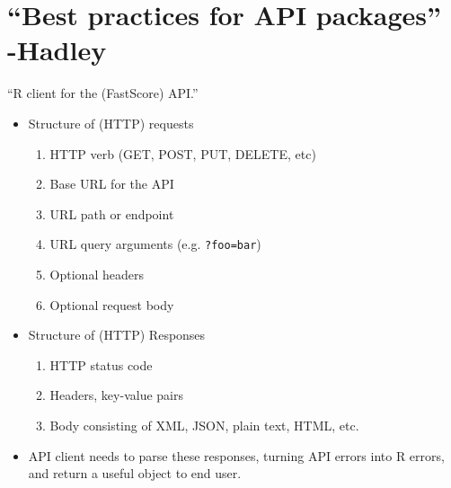\documentclass{article}
\begin{document}
\section{``Best practices for API packages'' -Hadley}
``R client for the (FastScore) API.''
\begin{itemize}
\item Structure of (HTTP) requests
  \begin{enumerate}
  \item HTTP verb (GET, POST, PUT, DELETE, etc)
  \item Base URL for the API
  \item URL path or endpoint
  \item URL query arguments (e.g. \verb|?foo=bar|)
  \item Optional headers
  \item Optional request body
  \end{enumerate}
\item Structure of (HTTP) Responses
  \begin{enumerate}
  \item HTTP status code
  \item Headers, key-value pairs
  \item Body consisting of XML, JSON, plain text, HTML, etc.
  \end{enumerate}
\item API client needs to parse these responses, turning API errors into R errors, and return a useful object to end user.
\end{itemize}
\end{document}
